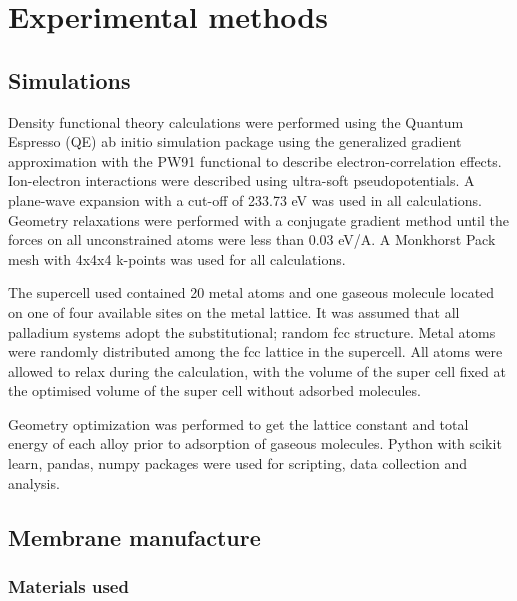 \chapter{Experimental methods}

\section{Simulations}
Density functional theory calculations were performed using the Quantum Espresso (QE) ab initio simulation package using the generalized gradient approximation with the PW91 functional to describe electron-correlation effects. Ion-electron interactions were described using ultra-soft pseudopotentials. A plane-wave expansion with a cut-off of 233.73 eV was used in all calculations. Geometry relaxations were performed with a conjugate gradient method until the forces on all unconstrained atoms were less than 0.03 eV/A. A Monkhorst Pack mesh with 4x4x4 k-points was used for all calculations.

The supercell used contained 20 metal atoms and one gaseous molecule located on one of four available sites on the metal lattice. It was assumed that all palladium systems adopt the substitutional; random fcc structure. Metal atoms were randomly distributed among the fcc lattice in the supercell. All atoms were allowed to relax during the calculation, with the volume of the super cell fixed at the optimised volume of the super cell without adsorbed molecules. 

Geometry optimization was performed to get the lattice constant and total energy of each alloy prior to adsorption of gaseous molecules. Python with scikit learn, pandas, numpy packages were used for scripting, data collection and analysis.

\section{Membrane manufacture}

\subsection{Materials used}
